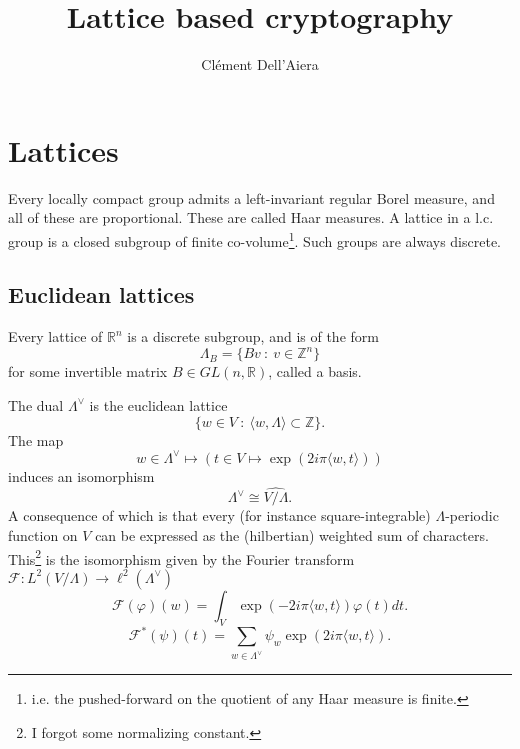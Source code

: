 \documentclass{article}
\title{Lattice based cryptography}
\author{Clément Dell'Aiera}
\begin{document}
\maketitle

\newpage	%
\section{Lattices}

Every locally compact group admits a left-invariant regular Borel measure, and all of these are proportional. These are called Haar measures. A lattice in a l.c. group is a closed subgroup of finite co-volume\footnote{i.e. the pushed-forward on the quotient of any Haar measure is finite.}. Such groups are always discrete. 

\subsection{Euclidean lattices}
Every lattice of $\mathbb R^n$ is a discrete subgroup, and is of the form 
\[\Lambda_B = \{ Bv \ : \ v\in \mathbb Z^n\} \]
for some invertible matrix $B\in GL(n,\mathbb R)$, called a basis. 

The dual $\Lambda^\vee$ is the euclidean lattice
\[\{ w \in V \ : \  \langle w , \Lambda \rangle \subset \mathbb Z \}.\]
The map 
$$w \in \Lambda^\vee \mapsto \left(t\in V \mapsto \exp(2i\pi \langle w,t \rangle)\right)$$ 
induces an isomorphism 
\[\Lambda^\vee \cong \widehat{V/\Lambda}.\] 
A consequence of which is that every (for instance square-integrable) $\Lambda$-periodic function on $V$ can be expressed as the (hilbertian) weighted sum of characters. This\footnote{I forgot some normalizing constant.} is the isomorphism given by the Fourier transform $\mathcal F : L^2(V/\Lambda ) \rightarrow \ell^2(\Lambda^\vee) $
\[\mathcal F(\varphi)(w) = \int_V \exp(-2i\pi \langle w,t \rangle) \varphi(t)dt. \]
\[\mathcal F^{*}(\psi)(t) = \sum_{w\in\Lambda^\vee} \psi_w \exp(2i\pi \langle w,t \rangle) . \]
\end{document}
